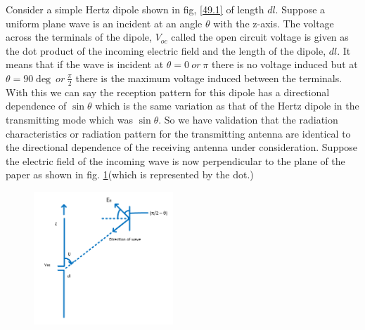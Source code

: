 Consider a simple Hertz dipole shown in fig, \ref{49.1} of length $dl$. Suppose a uniform plane wave is an incident at an angle $\theta$ with the z-axis. The voltage across the terminals of the dipole, $V_{oc}$ called the open circuit voltage is given as the dot product of the incoming electric field and the length of the dipole, $dl$. It means that if the wave is incident at $\theta = 0\ or\ \pi$ there is no voltage induced but at $\theta = 90\deg\ or\ \frac{\pi}{2}$ there is the maximum voltage induced between the terminals. With this we can say the reception pattern for this dipole has a directional dependence of $\sin\theta$ which is the same variation as that of the Hertz dipole in the transmitting mode which was $\sin\theta$. So we have validation that the radiation characteristics or radiation pattern for the transmitting antenna are identical to the directional dependence of the receiving antenna under consideration. Suppose the electric field of the incoming wave is now perpendicular to the plane of the paper as shown in fig. \ref{49.2}(which is represented by the dot.)
\begin{figure}[h]
\centering
\includegraphics[height=5cm]{./graphics/fig52__1}
\caption{}
\label{49.2}
\end{figure}

